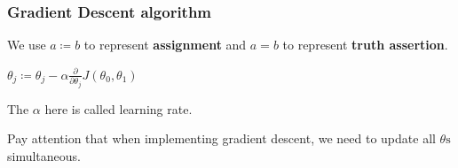 \documentclass[11pt]{article}
\begin{document}
\subsubsection*{Gradient Descent algorithm}
\label{sec-3-4-1}
We use \(a \coloneqq b\) to represent \textbf{assignment} and \( a = b\) to represent \textbf{truth assertion}.

\begin{algorithmic}
\REPEAT
\STATE $ \theta_j \coloneqq \theta_j - \alpha \frac{\partial}{\partial \theta_j} J(\theta_0,\theta_1) $ 
\end{algorithmic}

The $\alpha$ here is called learning rate.

Pay attention that when implementing gradient descent, we need to update all $\theta\text{s}$ simultaneous.
\end{document}
